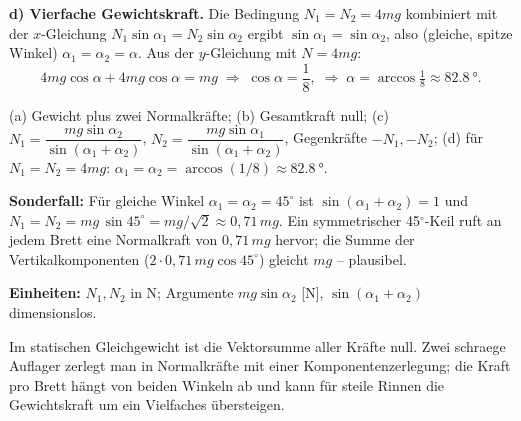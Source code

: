 \textbf{d) Vierfache Gewichtskraft.} Die Bedingung $N_1=N_2=4mg$
kombiniert mit der $x$-Gleichung $N_1\sin\alpha_1=N_2\sin\alpha_2$
ergibt $\sin\alpha_1=\sin\alpha_2$, also (gleiche, spitze Winkel)
$\alpha_1=\alpha_2=\alpha$. Aus der $y$-Gleichung mit $N=4mg$:
\begin{equation}
  4mg\cos\alpha+4mg\cos\alpha=mg
  \;\Rightarrow\;\cos\alpha=\frac18,
  \;\Rightarrow\;\alpha=\arccos\tfrac18\approx\qty{82.8}{\degree}.
\end{equation}

\begin{ergebnis}
(a) Gewicht plus zwei Normalkräfte; (b) Gesamtkraft null; (c)
$N_1=\dfrac{mg\sin\alpha_2}{\sin(\alpha_1+\alpha_2)}$,
$N_2=\dfrac{mg\sin\alpha_1}{\sin(\alpha_1+\alpha_2)}$, Gegenkräfte $-N_1,-N_2$;
(d) für $N_1=N_2=4mg$: $\alpha_1=\alpha_2=\arccos(1/8)\approx\qty{82.8}{\degree}$.
\end{ergebnis}

\begin{kontrolle}
\textbf{Sonderfall:} Für gleiche Winkel $\alpha_1=\alpha_2=45^\circ$ ist
$\sin(\alpha_1+\alpha_2)=1$ und
$N_1=N_2=mg\,\sin45^\circ=mg/\sqrt2\approx0{,}71\,mg$. Ein symmetrischer
45$^\circ$-Keil ruft an jedem Brett eine Normalkraft von $0{,}71\,mg$
hervor; die Summe der Vertikalkomponenten ($2\cdot0{,}71\,mg\cos45^\circ$)
gleicht $mg$ -- plausibel. \checkmark

\textbf{Einheiten:} $N_1,N_2$ in \unit{\newton}; Argumente $mg\sin\alpha_2$
[\unit{\newton}], $\sin(\alpha_1+\alpha_2)$ dimensionslos. \checkmark
\end{kontrolle}

\begin{merksatz}
Im statischen Gleichgewicht ist die Vektorsumme aller Kräfte null. Zwei
schraege Auflager zerlegt man in Normalkräfte mit einer
Komponentenzerlegung; die Kraft pro Brett hängt von beiden Winkeln ab und
kann für steile Rinnen die Gewichtskraft um ein Vielfaches übersteigen.
\end{merksatz}
